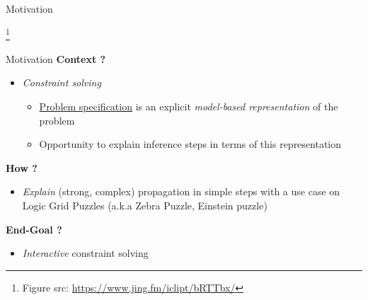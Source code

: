 \documentclass{beamer}
\begin{document}
\begin{frame}{Motivation}
{\begin{minipage}[t]{0.48\linewidth}
        \end{minipage}
        \footnote{\tiny Figure src: \url{https://www.jing.fm/iclipt/bRTTbx/}}
        }
\end{frame}

\begin{frame}{Motivation}
    \vfill
    \textbf{Context ?}
    \begin{itemize}
        \item \textit{Constraint solving}
              \begin{itemize}
                  \item \underline{Problem specification} is an explicit \emph{model-based representation} of the problem
                  \item Opportunity to explain inference steps in terms of this representation
              \end{itemize}
    \end{itemize}\pause
    \vfill
    \textbf{How ?}
    \begin{itemize}
        \item \emph{Explain} (strong, complex) propagation in simple steps with a use case on Logic Grid Puzzles (a.k.a Zebra Puzzle, Einstein puzzle)\pause
    \end{itemize}
    \vfill
    \textbf{End-Goal ?}
    \begin{itemize}
        \item \emph{Interactive} constraint solving
    \end{itemize}

    \vfill

\end{frame}
\end{document}
